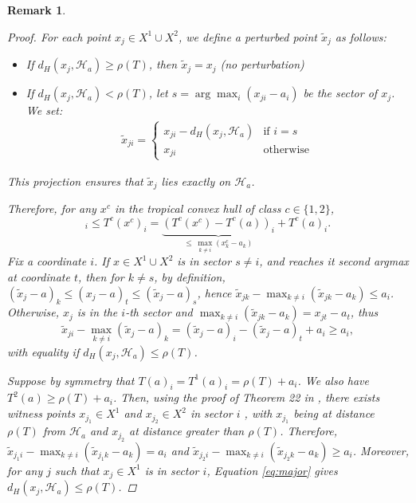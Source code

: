 \documentclass{article}
\newtheorem{remark}{Remark}
\begin{document}
\begin{remark}
\begin{proof}
For each point $x_j \in X^1 \cup X^2$, we define a perturbed point $\tilde{x}_j$ as follows:
\begin{itemize}
\item If $d_H(x_j, \mathcal{H}_a) \geq \rho(T)$, then $\tilde{x}_j = x_j$ (no perturbation)
\item If $d_H(x_j, \mathcal{H}_a) < \rho(T)$, let $s = \arg\max_i(x_{ji} - a_i)$ be the sector of $x_j$. We set:
  \begin{align}
  \tilde{x}_{ji} = \begin{cases}
  x_{ji} - d_H(x_j, \mathcal{H}_a) & \text{if } i = s \\
  x_{ji} & \text{otherwise}
  \end{cases}
  \end{align}
\end{itemize}

This projection ensures that $\tilde{x}_j$ lies exactly on $\mathcal{H}_a$.

Therefore, for any $x^{c}$ in the tropical convex hull of class $c\in\{1,2\}$,
\begin{equation}
[x^{c}]_{i}\le T^{c}(x^{c})_{i}=\underbrace{\left(T^{c}(x^{c})-T^{c}(a)\right)_{i}}_{\le\,\max_{k\ne i}(x_{k}^{c}-a_{k})}+T^{c}(a)_{i}.\label{eq:major}
\end{equation}
Fix a coordinate $i$. If $x\in X^{1}\cup X^{2}$ is in sector $s\ne i$, and reaches it second argmax at coordinate $t$, then for $k\ne s$, by definition,
$(\tilde{x}_{j}-a)_{k}\le(x_{j}-a)_{t}\le(\tilde{x}_{j}-a)_{s}$,
hence $\tilde{x}_{jk}-\max_{k\ne i}(\tilde{x}_{jk}-a_{k})\le a_{i}$.
Otherwise, $x_{j}$ is in the $i$-th sector and $\max_{k\ne i}(\tilde{x}_{jk}-a_{k})=x_{jt}-a_{t}$,
thus
\[
\tilde{x}_{ji}-\max_{k\ne i}(\tilde{x}_{j}-a)_{k}=(\tilde{x}_{j}-a)_{i}-(\tilde{x}_{j}-a)_{t}+a_{i}\ge a_{i},
\]
with equality if $d_{H}\left(x_{j},\mathcal{H}_{a}\right)\le\rho(T)$.

Suppose by symmetry that $T(a)_{i}=T^{1}(a)_{i}=\rho(T)+a_{i}$. We
also have $T^{2}(a)\ge\rho(T)+a_{i}$. Then, using the proof of Theorem
22 in \cite{akian2020}, there exists witness points $x_{j_{1}}\in X^{1}$ and
$x_{j_{2}}\in X^{2}$ in sector $i$ , with $x_{j_{1}}$ being at
distance $\rho(T)$ from $\mathcal{H}_{a}$ and $x_{j_{2}}$ at distance
greater than $\rho(T)$. Therefore, $\tilde{x}_{j_{1}i}-\max_{k\ne i}(\tilde{x}_{j_{1}k}-a_{k})=a_{i}$
and $\tilde{x}_{j_{2}i}-\max_{k\ne i}(\tilde{x}_{j_{2}k}-a_{k})\ge a_{i}$.
Moreover, for any $j$ such that $x_{j}\in X^1$ is in sector $i$,
Equation \ref{eq:major} gives $d_{H}(x_{j},\mathcal{H}_{a})\le\rho(T)$.


\end{proof}
\end{remark}
\end{document}
